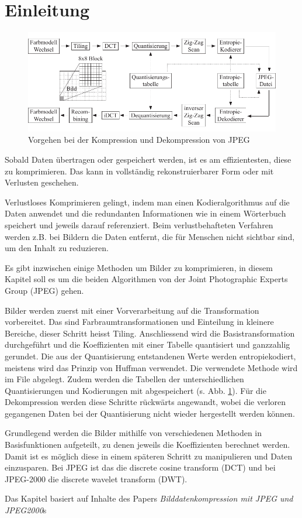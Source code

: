 %
%
%
%
\section{Einleitung\label{jpeg:section:einleitung}}
\begin{figure}
    \centering
    \includegraphics[width=\linewidth]{papers/jpeg/pictures/kompressionsschema.pdf}
    \caption{Vorgehen bei der Kompression und Dekompression von JPEG
        \label{jpeg:fig:kompressionsschema}}
\end{figure}
Sobald Daten übertragen oder gespeichert werden, ist es am effizientesten, diese zu komprimieren.
Das kann in vollständig rekonstruierbarer Form oder mit Verlusten geschehen.

Verlustloses Komprimieren gelingt, indem man einen Kodieralgorithmus auf die Daten anwendet und die redundanten Informationen wie in einem Wörterbuch speichert und jeweils darauf referenziert. Beim verlustbehafteten Verfahren werden z.B. bei Bildern die Daten entfernt, die für Menschen nicht sichtbar sind, um den Inhalt zu reduzieren.

Es gibt inzwischen einige Methoden um Bilder zu komprimieren, in diesem Kapitel soll es um die beiden Algorithmen von der Joint Photographic Experts Group (JPEG) gehen.


Bilder werden zuerst mit einer Vorverarbeitung auf die Transformation vorbereitet.
Das sind Farb\-raumtransformationen und Einteilung in kleinere Bereiche, dieser Schritt heisst Tiling.
Anschliessend wird die Basistransformation durchgeführt und die Koeffizienten mit einer Tabelle quantisiert und ganzzahlig gerundet.
Die aus der Quantisierung entstandenen Werte werden entropiekodiert, meistens wird das Prinzip von Huffman verwendet.
Die verwendete Methode wird im File abgelegt.
Zudem werden die Tabellen der unterschiedlichen Quantisierungen und Kodierungen mit abgespeichert (s. Abb. \ref{jpeg:fig:kompressionsschema}).
Für die Dekompression werden diese Schritte rückwärts angewandt, wobei die verloren gegangenen Daten bei der Quantisierung nicht wieder hergestellt werden können. 

Grundlegend werden die Bilder mithilfe von verschiedenen Methoden in Basisfunktionen aufgeteilt, zu denen jeweils die Koeffizienten berechnet werden.
Damit ist es möglich diese in einem späteren Schritt zu manipulieren und Daten einzusparen. 
Bei JPEG ist das die discrete cosine transform (DCT) und bei JPEG-2000 die discrete wavelet transform (DWT).

Das Kapitel basiert auf Inhalte des Papers \textit{Bilddatenkompression mit JPEG und JPEG2000}s\cite{jpeg:laurahochstrat}